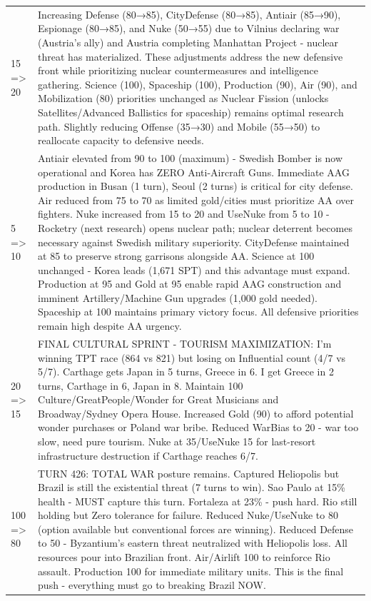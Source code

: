 \begin{longtable}{p{}p{}}
15 => 20 & Increasing Defense (80→85), CityDefense (80→85), Antiair (85→90), Espionage (80→85), and Nuke (50→55) due to Vilnius declaring war (Austria's ally) and Austria completing Manhattan Project - nuclear threat has materialized. These adjustments address the new defensive front while prioritizing nuclear countermeasures and intelligence gathering. Science (100), Spaceship (100), Production (90), Air (90), and Mobilization (80) priorities unchanged as Nuclear Fission (unlocks Satellites/Advanced Ballistics for spaceship) remains optimal research path. Slightly reducing Offense (35→30) and Mobile (55→50) to reallocate capacity to defensive needs. \\
5 => 10 & Antiair elevated from 90 to 100 (maximum) - Swedish Bomber is now operational and Korea has ZERO Anti-Aircraft Guns. Immediate AAG production in Busan (1 turn), Seoul (2 turns) is critical for city defense. Air reduced from 75 to 70 as limited gold/cities must prioritize AA over fighters. Nuke increased from 15 to 20 and UseNuke from 5 to 10 - Rocketry (next research) opens nuclear path; nuclear deterrent becomes necessary against Swedish military superiority. CityDefense maintained at 85 to preserve strong garrisons alongside AA. Science at 100 unchanged - Korea leads (1,671 SPT) and this advantage must expand. Production at 95 and Gold at 95 enable rapid AAG construction and imminent Artillery/Machine Gun upgrades (1,000 gold needed). Spaceship at 100 maintains primary victory focus. All defensive priorities remain high despite AA urgency. \\
20 => 15 & FINAL CULTURAL SPRINT - TOURISM MAXIMIZATION: I'm winning TPT race (864 vs 821) but losing on Influential count (4/7 vs 5/7). Carthage gets Japan in 5 turns, Greece in 6. I get Greece in 2 turns, Carthage in 6, Japan in 8. Maintain 100 Culture/GreatPeople/Wonder for Great Musicians and Broadway/Sydney Opera House. Increased Gold (90) to afford potential wonder purchases or Poland war bribe. Reduced WarBias to 20 - war too slow, need pure tourism. Nuke at 35/UseNuke 15 for last-resort infrastructure destruction if Carthage reaches 6/7. \\
100 => 80 & TURN 426: TOTAL WAR posture remains. Captured Heliopolis but Brazil is still the existential threat (7 turns to win). Sao Paulo at 15\% health - MUST capture this turn. Fortaleza at 23\% - push hard. Rio still holding but Zero tolerance for failure. Reduced Nuke/UseNuke to 80 (option available but conventional forces are winning). Reduced Defense to 50 - Byzantium's eastern threat neutralized with Heliopolis loss. All resources pour into Brazilian front. Air/Airlift 100 to reinforce Rio assault. Production 100 for immediate military units. This is the final push - everything must go to breaking Brazil NOW. \\

\end{longtable}
